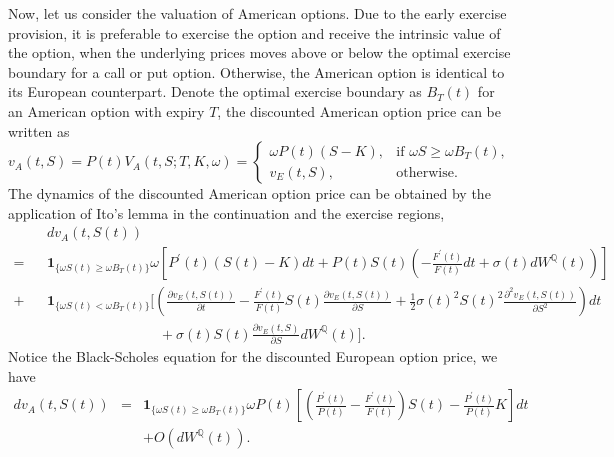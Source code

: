\documentclass[12pt]{article}
\begin{document}
    Now, let us consider the valuation of American options. Due to the early exercise provision, it is preferable
    to exercise the option and receive the intrinsic value of the option, when the underlying prices moves above or
    below the optimal exercise boundary for a call or put option. Otherwise, the American option is identical to
    its European counterpart. Denote the optimal exercise boundary as $B_T(t)$ for an American option with expiry
    $T$, the discounted American option price can be written as
    \begin{equation}
      v_A(t,S)=P(t)V_A(t,S;T,K,\omega)
              =\begin{cases}
                 \omega P(t)\left(S-K\right), & \mbox{if } \omega S \geq \omega B_T(t),\\
                 v_E(t,S), & \mbox{otherwise}.
               \end{cases}
    \end{equation}
    The dynamics of the discounted American option price can be obtained by the application of Ito's lemma in the
    continuation and the exercise regions,
    \begin{eqnarray}
      &&dv_A(t,S(t)) \nonumber\\
      =&&\mathbf{1}_{\{\omega S(t) \geq \omega B_T(t)\}}\omega\left[P^{\prime}(t)\left(S(t)-K\right)dt
                  +P(t)S(t)\left(-\frac{F^{\prime}(t)}{F(t)}dt+\sigma(t)dW^{\mathbb Q}(t)\right)\right]\nonumber\\
      +  && \mathbf{1}_{\{\omega S(t)<\omega B_T(t)\}}\bigg[\left(\frac{\partial v_E(t,S(t))}{\partial t}-\frac{F^{\prime}(t)}{F(t)}S(t)\frac{\partial v_E(t,S(t))}{\partial S}
               +\frac{1}{2}\sigma(t)^2S(t)^2\frac{\partial^2 v_E(t,S(t))}{\partial S^2}\right)dt\nonumber\\
               &&\quad\quad\quad\quad\quad\quad\quad\quad +\sigma(t)S(t)\frac{\partial v_E(t,S)}{\partial S}dW^{\mathbb Q}(t)\bigg].
    \end{eqnarray}
    Notice the Black-Scholes equation for the discounted European option price, we have
    \begin{eqnarray}
      dv_A(t,S(t))&=&\mathbf{1}_{\{\omega S(t)\geq\omega B_T(t)\}}\omega P(t)
                     \left[\left(\frac{P^{\prime}(t)}{P(t)}-\frac{F^{\prime}(t)}{F(t)}\right)S(t)
                           -\frac{P^{\prime}(t)}{P(t)}K\right]dt\nonumber\\
               && + O\left(dW^{\mathbb Q}(t)\right).
    \end{eqnarray}
\end{document}
